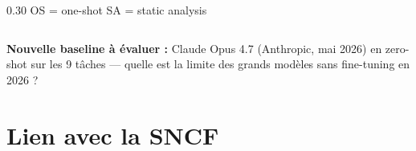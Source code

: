 \documentclass[aspectratio=169]{beamer}
\begin{document}
\begin{frame}
\begin{columns}[T]
\begin{column}{0.30\textwidth}
      \vspace{0.3em}
      {\tiny OS = one-shot \quad SA = static analysis}
    \end{column}
  \end{columns}

  \vspace{0.5em}
  \begin{alertblock}{}
    \centering\small
    \textbf{Nouvelle baseline à évaluer :} Claude Opus 4.7 (Anthropic, mai 2026)
    en zero-shot sur les 9 tâches — quelle est la limite des grands modèles sans fine-tuning en 2026 ?
  \end{alertblock}
\end{frame}

\section{Lien avec la SNCF}
\end{document}
